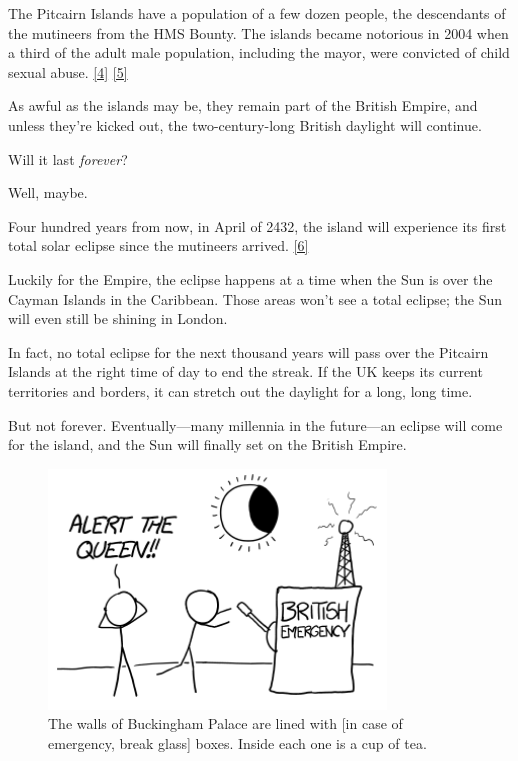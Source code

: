 {{The Pitcairn Islands have a population of a few dozen people, the descendants of the mutineers from the HMS Bounty. The islands became notorious in 2004 when a third of the adult male population, including the mayor, were convicted of child sexual abuse. \href{http://www.vanityfair.com/culture/features/2008/01/pitcairn200801}{[4]} \href{http://www.npr.org/templates/story/story.php?storyId=103569364} {[5]}}

{As awful as the islands may be, they remain part of the British Empire, and unless they're kicked out, the two-century-long British daylight will continue.}

{Will it last \emph{forever}?}

{Well, maybe.}

{Four hundred years from now, in April of 2432, the island will experience its first total solar eclipse since the mutineers arrived. \href{http://eclipse.gsfc.nasa.gov/JSEX/JSEX-index.html}{[6]}}

{Luckily for the Empire, the eclipse happens at a time when the Sun is over the Cayman Islands in the Caribbean. Those areas won't see a total eclipse; the Sun will even still be shining in London.}

{In fact, no total eclipse for the next thousand years will pass over the Pitcairn Islands at the right time of day to end the streak. If the UK keeps its current territories and borders, it can stretch out the daylight for a long, long time.}

{But not forever. Eventually—many millennia in the future—an eclipse will come for the island, and the Sun will finally set on the British Empire.}

\begin{figure}[!htbp]
\centering
\includegraphics[scale=0.5, max width=0.8\textwidth]{imgs/a/48/empire_eclipse.png}
\caption{The walls of Buckingham Palace are lined with [in case of emergency, break glass] boxes. Inside each one is a cup of tea.}
\end{figure}

}
